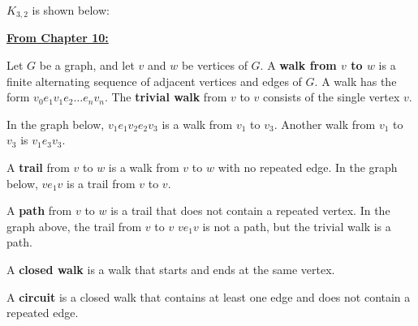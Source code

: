 \documentclass[11pt]{article}
\begin{document}
$K_{3, 2}$ is shown below:

\begin{center}
\end{center}

\begin{center}
    \underline{\bf From Chapter 10:}
\end{center}

Let $G$ be a graph, and let $v$ and $w$ be vertices of $G$. A {\bf walk from 
$v$ to $w$} is a finite alternating sequence of adjacent vertices and edges of 
$G$. A walk has the form $v_0 e_1 v_1 e_2 \dots e_n v_n$. The {\bf trivial walk} 
from $v$ to $v$ consists of the single vertex $v$. 

In the graph below, $v_1 e_1 v_2 e_2 v_3$ is a walk from $v_1$ to $v_3$. Another 
walk from $v_1$ to $v_3$ is $v_1 e_3 v_3$. 

\begin{center}
\end{center}

A {\bf trail} from $v$ to $w$ is a walk from $v$ to $w$ with no repeated edge. 
In the graph below, $v e_1 v$ is a trail from $v$ to $v$. 
\begin{center}
\end{center}

\bigskip
A {\bf path} from $v$ to $w$ is a trail that does not contain a repeated vertex. 
In the graph above, the trail from $v$ to $v$ $v e_1 v$ is not a path, but the 
trivial walk is a path. 

\bigskip 
A {\bf closed walk} is a walk that starts and ends at the same vertex. 

\bigskip 
A {\bf circuit} is a closed walk that contains at least one edge and does not 
contain a repeated edge. 
\end{document}
